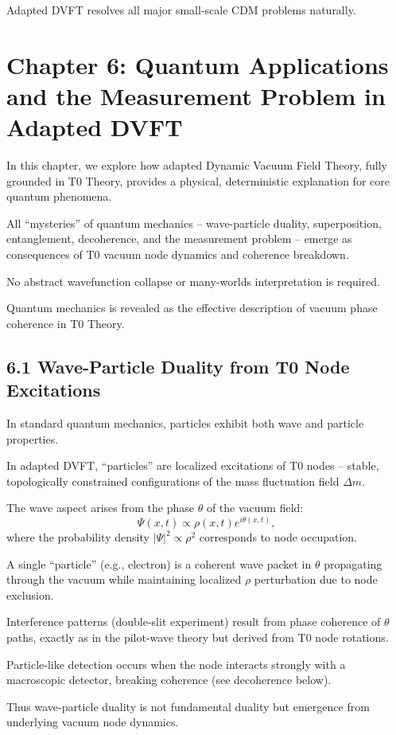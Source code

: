 	Adapted DVFT resolves all major small-scale CDM problems naturally.
	
	\section{Chapter 6: Quantum Applications and the Measurement Problem in Adapted DVFT}
	
	In this chapter, we explore how adapted Dynamic Vacuum Field Theory, fully grounded in T0 Theory, provides a physical, deterministic explanation for core quantum phenomena.
	
	All ``mysteries'' of quantum mechanics – wave-particle duality, superposition, entanglement, decoherence, and the measurement problem – emerge as consequences of T0 vacuum node dynamics and coherence breakdown.
	
	No abstract wavefunction collapse or many-worlds interpretation is required.
	
	Quantum mechanics is revealed as the effective description of vacuum phase coherence in T0 Theory.
	
	\subsection{6.1 Wave-Particle Duality from T0 Node Excitations}
	
	In standard quantum mechanics, particles exhibit both wave and particle properties.
	
	In adapted DVFT, ``particles'' are localized excitations of T0 nodes – stable, topologically constrained configurations of the mass fluctuation field $\Delta m$.
	
	The wave aspect arises from the phase $\theta$ of the vacuum field:
	\[
	\Psi(x,t) \propto \rho(x,t) e^{i\theta(x,t)},
	\]
	where the probability density $|\Psi|^2 \propto \rho^2$ corresponds to node occupation.
	
	A single ``particle'' (e.g., electron) is a coherent wave packet in $\theta$ propagating through the vacuum while maintaining localized $\rho$ perturbation due to node exclusion.
	
	Interference patterns (double-slit experiment) result from phase coherence of $\theta$ paths, exactly as in the pilot-wave theory but derived from T0 node rotations.
	
	Particle-like detection occurs when the node interacts strongly with a macroscopic detector, breaking coherence (see decoherence below).
	
	Thus wave-particle duality is not fundamental duality but emergence from underlying vacuum node dynamics.
	
